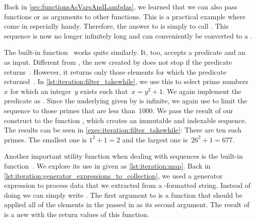 Back in \cref{sec:functionsAsVarsAndLambdas}, we learned that we can also pass functions or  as arguments to other functions.
This is a practical example where  come in especially handy.
Therefore, the answer to  is simply to call .
This sequence is now no longer infinitely long and can conveniently be converted to a .

The built-in function~ works quite similarly.
It, too, accepts a predicate and an~ as input.
Different from , the new  created by  does not stop if the predicate returns~.
However, it returns only those elements for which the predicate returned~.
In \cref{lst:iteration:filter_takewhile}, we use this to select prime numbers~$x$ for which an integer~$y$ exists such that~$x=y^2+1$.
We again implement the predicate as .
Since the underlying  given by  is infinite, we again use  to limit the sequence to those primes that are less than~1000.
We pass the result of our construct to the function , which creates an immutable and indexable sequence.
The results can be seen in \cref{exec:iteration:filter_takewhile}:
There are ten such primes.
The smallest one is $1^2+1=2$ and the largest one is~$26^2+1=677$.

%
%
%
Another important utility function when dealing with sequences is the built-in function~.
We explore its use in  given as \cref{lst:iteration:map}.
Back in \cref{lst:iteration:generator_expressions_to_collection}, we used a generator expression to process data that we extracted from a -formatted string.
Instead of doing  we can simply write .
The first argument to  is a function that should be applied all of the elements in the  passed in as its second argument.
The result of  is a new  with the return values of this function.

